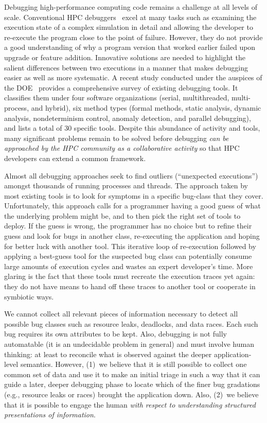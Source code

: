 Debugging high-performance computing code
remains a challenge at all levels of scale.
%
Conventional HPC debuggers~\cite{allinea-ddt,roguewave,others}
excel at many tasks such as examining the execution
state of a complex simulation in detail
and allowing the developer to re-execute
the program close to the point of failure.
%
However, they do not provide a good understanding
of why a program version that worked earlier
failed upon upgrade or feature addition.
%
Innovative solutions are needed to highlight the
salient differences between two executions in a manner
that makes debugging easier as well as more systematic.
%
A recent study conducted under the auspices of the
DOE~\cite{DBLP:journals/corr/GopalakrishnanH17}
provides a comprehensive survey
of existing debugging tools.
%
It classifies them under
four software organizations (serial, multithreaded,
multi-process, and hybrid), six
method types (formal methods, static analysis, dynamic
analysis, nondeterminism control, anomaly detection,
and parallel debugging), and lists a total of 30 specific
tools.
%
Despite this abundance of activity and tools, many
significant problems remain to be solved before debugging
{\em can be approached by the HPC community as a collaborative
activity} so that HPC developers can extend a common
framework.


Almost all debugging approaches seek to find outliers (``unexpected
executions'') amongst thousands of running processes and threads.
%
The approach taken by most existing tools is to
look for symptoms in a specific bug-class that they cover.
%
Unfortunately,
this approach calls for a programmer having a good guess of what
the underlying problem might be,
and to then pick the right set of tools to deploy.
%
If the guess is wrong, the programmer has no choice but to
refine their guess
and look for bugs in another class,
re-executing the application and hoping for
better luck with another tool.
%
This iterative loop of re-execution followed by applying a
best-guess tool for the suspected bug class can potentially consume
large amounts of execution cycles and wastes an
expert developer's time.
%
More glaring is the fact that these tools must recreate the
execution traces yet again: they do not have means to hand off
these traces to another tool or cooperate in symbiotic ways.



We cannot collect all relevant pieces of information
necessary to detect all possible bug classes such as
resource leaks, deadlocks, and data races.
%
Each such bug requires its own attributes to be kept.
%
Also, debugging is not fully automatable (it is
an undecidable problem in general) and must involve human thinking:
at least to reconcile what is observed against the deeper application-level semantics.
%
However, (1)~we believe that it is still possible to collect one common set
of data and use it to make an initial triage in such
a way that it can guide a later, deeper debugging phase to locate
which of the finer bug gradations (e.g., resource leaks or races) brought
the application down.
%
Also, (2)~we believe that it is possible to engage the human {\em with respect
to understanding structured presentations of information}.



